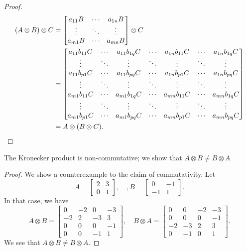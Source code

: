 \documentclass[11pt]{article}
\newcommand{\kp}{\otimes} %
\begin{document}
\begin{proof}
\begin{align*}
(A \kp B) \kp C &= \begin{bmatrix}
a_{11} B & \cdots & a_{1n}B \\
\vdots & \ddots & \vdots \\
a_{m1} B & \cdots & a_{mn} B
\end{bmatrix} \kp C \\
&= \begin{bmatrix}
a_{11} b_{11} C & \cdots & a_{11} b_{1q} C & \cdots & a_{1n} b_{11} C & \cdots & a_{1n} b_{1q} C \\
\vdots & \ddots & \vdots & \ddots & \vdots & \ddots & \vdots \\
a_{11} b_{p1} C & \cdots & a_{11} b_{pq} C & \cdots & a_{1n} b_{p1} C & \cdots & a_{1n} b_{pq} C \\
\vdots & \ddots & \vdots & \ddots & \vdots & \ddots & \vdots \\
a_{m1} b_{11} C & \cdots & a_{m1} b_{1q} C & \cdots & a_{mn} b_{11} C & \cdots & a_{mn} b_{1q} C \\
\vdots & \ddots & \vdots & \ddots & \vdots & \ddots & \vdots \\
a_{m1} b_{p1} C & \cdots & a_{m1} b_{pq} C & \cdots & a_{mn} b_{p1} C & \cdots & a_{mn} b_{pq} C
\end{bmatrix}\\
&= A \kp (B \kp C).\qedhere
\end{align*}
\end{proof}

The Kronecker product is non-commutative; we show that \(A \kp B \neq B \kp A\)

\begin{proof}
We show a counterexample to the claim of commutativity.
Let
\[
A = \begin{bmatrix}
2 & 3 \\ 0 & 1
\end{bmatrix}, \quad, B = \begin{bmatrix}
0 & -1 \\ -1 & 1
\end{bmatrix}.
\]
In that case, we have
\[
A \kp B = \begin{bmatrix}
0 & -2 & 0 & -3 \\
-2 & 2 & -3 & 3 \\
0 & 0 & 0 & -1 \\
0 & 0 & -1 & 1
\end{bmatrix}, \quad B \kp A = \begin{bmatrix}
0 & 0 & -2 & -3 \\
0 & 0 & 0 & -1 \\
-2 & -3 & 2 & 3 \\
0 & -1 & 0 & 1
\end{bmatrix}.
\]
We see that \(A \kp B \neq B \kp A\).
\end{proof}
\end{document}
